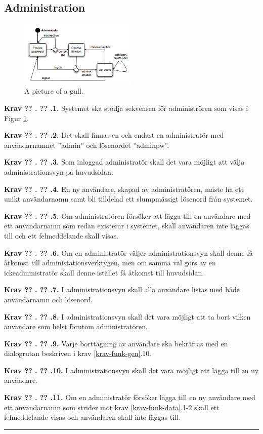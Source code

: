 \documentclass[a4paper]{article}
\newcommand\getcurrentref[1]{%
 \ifnumequal{\value{#1}}{0}
  {??}
  {\the\value{#1}}%
}
\newcommand\requirement[2]{
	\numberedrow{Krav}{#1}{#2}
}
\newcommand\numberedrow[3]{
	\noindent
	\textbf{#1 \getcurrentref{section}.\getcurrentref{subsection}.#2.} #3
	
}
\begin{document}
\subsection{Administration}
\label{krav-funk-admin}

\begin{figure}[h!]
  \centering
    \includegraphics[width=0.5\textwidth]{admin_usage}
   \caption{A picture of a gull.}
   \label{image_admin_usage}
\end{figure}
\requirement{1}{Systemet ska stödja sekvensen för administrören som visas i Figur \ref{image_admin_usage}.}
\requirement{2}{Det skall finnas en och endast en administratör med användarnamnet ''admin'' och lösenordet ''adminpw''.}
\requirement{3}{Som inloggad administratör skall det vara möjligt att välja administrationsvyn på huvudsidan.}
\requirement{4}{En ny användare, skapad av administratören, måste ha ett unikt användarnamn samt bli tilldelad ett slumpmässigt lösenord från systemet.}
\requirement{5}{Om administratören försöker att lägga till en användare med ett användarnamn som redan existerar i systemet, skall användaren inte läggas till och ett felmeddelande skall visas.}
\requirement{6}{Om en administratör väljer administrationsvyn skall denne få åtkomst till administationsverktygen, men om samma val görs av en ickeadministratör skall denne istället få åtkomst till huvudsidan.}
\requirement{7}{I administrationsvyn skall alla användare listas med både användarnamn och lösenord.}
\requirement{8}{I administrationsvyn skall det vara möjligt att ta bort vilken användare som helst förutom administratören.}
\requirement{9}{Varje borttagning av användare ska bekräftas med en dialogrutan beskriven i krav \ref{krav-funk-gen}.10.}
\requirement{10}{I administrationsvyn skall det vara möjligt att lägga till en ny användare.}
\requirement{11}{Om en administratör försöker lägga till en ny användare med ett användarnamn som strider mot krav \ref{krav-funk-data}.1-2 skall ett felmeddelande visas och användaren skall inte läggas till.}

\noindent\rule{8cm}{0.4pt} \\ %
\end{document}
